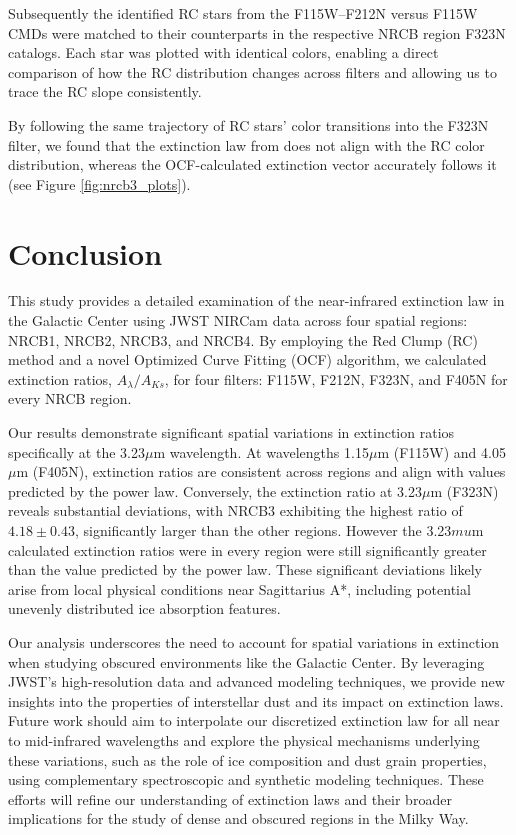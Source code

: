 \documentclass[twocolumn]{aastex631}
\begin{document}
Subsequently the identified RC stars from the F115W–F212N versus F115W CMDs were
matched to their counterparts in the respective NRCB region F323N catalogs. Each star
was plotted with identical colors, enabling a direct comparison of how the RC distribution
changes across filters and allowing us to trace the RC slope consistently.

By following the same trajectory of RC stars' color transitions into the F323N filter, we found
that the extinction law from \citep{Fritz2011} does not align with the RC color distribution,
whereas the OCF-calculated extinction vector accurately follows it (see Figure
\ref{fig:nrcb3_plots}).

\section{Conclusion}

This study provides a detailed examination of the near-infrared extinction law
in the Galactic Center using JWST NIRCam data across four spatial regions:
NRCB1, NRCB2, NRCB3, and NRCB4. By employing the Red Clump (RC) method and a
novel Optimized Curve Fitting (OCF) algorithm, we calculated extinction ratios,
$A_\lambda / A_{Ks}$, for four filters: F115W, F212N, F323N, and F405N for every 
NRCB region. 

Our results demonstrate significant spatial variations in extinction ratios specifically 
at the 3.23$\mu$m wavelength. At
wavelengths 1.15$\mu$m (F115W) and 4.05$\mu$m (F405N), extinction ratios are
consistent across regions and align with values predicted 
by the \citep{Fritz2011} power law. Conversely, the extinction ratio at 3.23$\mu$m
(F323N) reveals substantial deviations, with NRCB3 exhibiting the highest ratio
of $4.18 \pm 0.43$, significantly larger than the other regions.
However the 3.23$mu$m calculated extinction ratios were in every region were
still significantly greater than the value predicted by the \citep{Fritz2011} power law. 
These significant
deviations likely arise from local physical conditions near Sagittarius A*,
including potential unevenly distributed ice absorption features. 

Our analysis underscores the need to account for spatial variations in
extinction when studying obscured environments like the Galactic Center. By
leveraging JWST's high-resolution data and advanced modeling techniques, we
provide new insights into the properties of interstellar dust and its impact on
extinction laws. Future work should aim to interpolate our discretized extinction law for all near to mid-infrared
wavelengths and explore the physical mechanisms
underlying these variations, such as the role of ice composition and dust grain
properties, using complementary spectroscopic and synthetic modeling techniques.
These efforts will refine our understanding of extinction laws and their broader
implications for the study of dense and obscured regions in the Milky Way.
\end{document}
